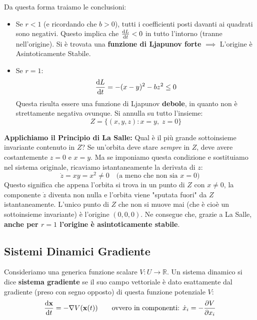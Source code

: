 \documentclass[openany]{book}
\theoremstyle{definition}
\theoremstyle{remark}
\newcommand{\R}{\mathbb{R}}
\begin{document}
Da questa forma traiamo le conclusioni:
\begin{itemize}
    \item Se $r < 1$ (e ricordando che $b > 0$), tutti i coefficienti posti davanti ai quadrati sono negativi. Questo implica che $\dv{L}{t} < 0$ in tutto l'intorno (tranne nell'origine). Si è trovata una \textbf{funzione di Ljapunov forte} $\implies$ L'origine è Asintoticamente Stabile.
    
    \item Se $r = 1$:
    \begin{equation*}
        \dv{L}{t} = -(x - y)^2 - bz^2 \le 0
    \end{equation*}
    Questa risulta essere una funzione di Ljapunov \textbf{debole}, in quanto non è strettamente negativa ovunque. Si annulla su tutto l'insieme:
    \begin{equation*}
        Z = \{ (x,y,z) : x = y, \; z = 0 \}
    \end{equation*}
\end{itemize}

\textbf{Applichiamo il Principio di La Salle:} Qual è il più grande sottoinsieme invariante contenuto in $Z$? 
Se un'orbita deve stare \textit{sempre} in $Z$, deve avere costantemente $z = 0$ e $x = y$. Ma se imponiamo questa condizione e sostituiamo nel sistema originale, ricaviamo istantaneamente la derivata di $z$:
\begin{equation*}
    \dot{z} = xy = x^2 \neq 0 \quad \text{(a meno che non sia } x=0)
\end{equation*}
Questo significa che appena l'orbita si trova in un punto di $Z$ con $x \neq 0$, la componente $\dot{z}$ diventa non nulla e l'orbita viene "sputata fuori" da $Z$ istantaneamente. 
L'unico punto di $Z$ che non si muove mai (che è cioè un sottoinsieme invariante) è l'origine $(0,0,0)$. 
Ne consegue che, grazie a La Salle, \textbf{anche per $r=1$ l'origine è asintoticamente stabile}.


\subsection{Sistemi Dinamici Gradiente}

Consideriamo una generica funzione scalare $V: U \to \R$. 
Un sistema dinamico si dice \textbf{sistema gradiente} se il suo campo vettoriale è dato esattamente dal gradiente (preso con segno opposto) di questa funzione potenziale $V$:
\begin{equation}
    \dv{\vb{x}}{t} = -\nabla V(\vb{x}(t)) \qquad \text{ovvero in componenti: } \dot{x}_i = -\pdv{V}{x_i}
\end{equation}
\end{document}
